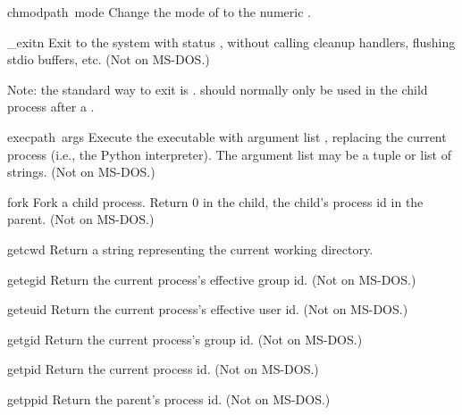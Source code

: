 \begin{funcdesc}{chmod}{path\, mode}
Change the mode of  to the numeric .
\end{funcdesc}

\begin{funcdesc}{_exit}{n}
Exit to the system with status , without calling cleanup
handlers, flushing stdio buffers, etc.
(Not on MS-DOS.)

Note: the standard way to exit is .
 should normally only be used in the child process
after a .
\end{funcdesc}

\begin{funcdesc}{exec}{path\, args}
Execute the executable  with argument list ,
replacing the current process (i.e., the Python interpreter).
The argument list may be a tuple or list of strings.
(Not on MS-DOS.)
\end{funcdesc}

\begin{funcdesc}{fork}{}
Fork a child process.  Return 0 in the child, the child's process id
in the parent.
(Not on MS-DOS.)
\end{funcdesc}

\begin{funcdesc}{getcwd}{}
Return a string representing the current working directory.
\end{funcdesc}

\begin{funcdesc}{getegid}{}
Return the current process's effective group id.
(Not on MS-DOS.)
\end{funcdesc}

\begin{funcdesc}{geteuid}{}
Return the current process's effective user id.
(Not on MS-DOS.)
\end{funcdesc}

\begin{funcdesc}{getgid}{}
Return the current process's group id.
(Not on MS-DOS.)
\end{funcdesc}

\begin{funcdesc}{getpid}{}
Return the current process id.
(Not on MS-DOS.)
\end{funcdesc}

\begin{funcdesc}{getppid}{}
Return the parent's process id.
(Not on MS-DOS.)
\end{funcdesc}

